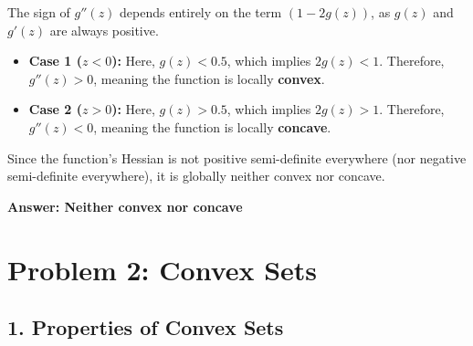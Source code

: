 \documentclass[12pt]{article}
\begin{document}
\begin{enumerate}
    The sign of $g''(z)$ depends entirely on the term $(1 - 2g(z))$, as $g(z)$ and $g'(z)$ are always positive.
    \begin{itemize}
        \item \textbf{Case 1 ($z < 0$):} Here, $g(z) < 0.5$, which implies $2g(z) < 1$. Therefore, $g''(z) > 0$, meaning the function is locally \textbf{convex}.
        \item \textbf{Case 2 ($z > 0$):} Here, $g(z) > 0.5$, which implies $2g(z) > 1$. Therefore, $g''(z) < 0$, meaning the function is locally \textbf{concave}.
    \end{itemize}
    
    Since the function's Hessian is not positive semi-definite everywhere (nor negative semi-definite everywhere), it is globally neither convex nor concave.
    
    \textbf{Answer: Neither convex nor concave}
\end{enumerate}

\newpage
\section*{Problem 2: Convex Sets}

\subsection*{1. Properties of Convex Sets}
\end{document}
